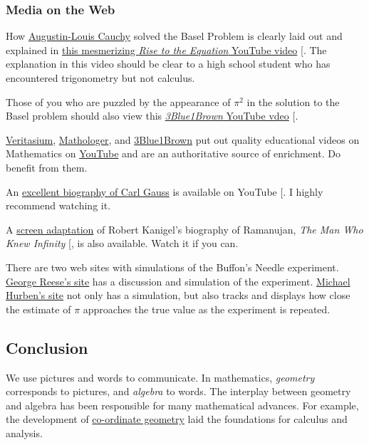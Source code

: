 \documentclass[
  a4paper,
]{article}
\begin{document}
\subsubsection{Media on the Web}\label{media-on-the-web}

How
\href{https://en.wikipedia.org/wiki/Augustin-Louis_Cauchy}{Augustin-Louis
Cauchy} solved the Basel Problem is clearly laid out and explained in
\href{https://www.youtube.com/watch?v=2jgtAo3Ztf}{this mesmerizing
\emph{Rise to the Equation} YouTube video}
{[}\citeproc{ref-cauchy-basel}{52}{]}. The explanation in this video
should be clear to a high school student who has encountered
trigonometry but not calculus.

Those of you who are puzzled by the appearance of \(\pi^2\) in the
solution to the Basel problem should also view this
\href{https://www.youtube.com/watch?v=d-o3eB9sfls}{\emph{3Blue1Brown}
YouTube vdeo} {[}\citeproc{ref-pi-squared-basel}{53}{]}.

\href{https://www.youtube.com/@veritasium}{Veritasium},
\href{https://www.youtube.com/@Mathologer}{Mathologer}, and
\href{https://www.youtube.com/c/3blue1brown}{3Blue1Brown} put out
quality educational videos on Mathematics on
\href{https://www.youtube.com/}{YouTube} and are an authoritative source
of enrichment. Do benefit from them.

An \href{https://www.youtube.com/watch?v=LmmyAOkajVM}{excellent
biography of Carl Gauss} is available on YouTube
{[}\citeproc{ref-gauss-bio}{31}{]}. I highly recommend watching it.

A \href{https://www.imdb.com/title/tt0787524/}{screen adaptation} of
Robert Kanigel's biography of Ramanujan, \emph{The Man Who Knew
Infinity} {[}\citeproc{ref-kanigel-1992}{41}{]}, is also available.
Watch it if you can.

There are two web sites with simulations of the Buffon's Needle
experiment.
\href{https://www.mste.uiuc.edu/reese/buffon/buffon.html}{George Reese's
site} has a discussion and simulation of the experiment.
\href{https://www.angelfire.com/wa/hurben/buff.html}{Michael Hurben's
site} not only has a simulation, but also tracks and displays how close
the estimate of \(\pi\) approaches the true value as the experiment is
repeated.

\subsection{Conclusion}\label{conclusion}

We use pictures and words to communicate. In mathematics,
\emph{geometry} corresponds to pictures, and \emph{algebra} to words.
The interplay between geometry and algebra has been responsible for many
mathematical advances. For example, the development of
\href{https://www.britannica.com/science/Cartesian-coordinates}{co-ordinate
geometry} laid the foundations for calculus and analysis.
\end{document}
